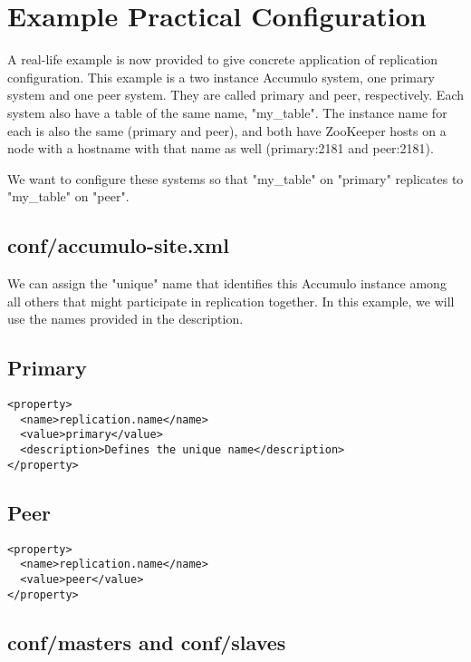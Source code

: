 \section{Example Practical Configuration}

A real-life example is now provided to give concrete application of replication configuration. This
example is a two instance Accumulo system, one primary system and one peer system. They are called
primary and peer, respectively. Each system also have a table of the same name, "my\_table". The instance
name for each is also the same (primary and peer), and both have ZooKeeper hosts on a node with a hostname
with that name as well (primary:2181 and peer:2181).

We want to configure these systems so that "my\_table" on "primary" replicates to "my\_table" on "peer".

\subsection{conf/accumulo-site.xml}

We can assign the "unique" name that identifies this Accumulo instance among all others that might participate
in replication together. In this example, we will use the names provided in the description.

\subsection{Primary}

\begingroup\fontsize{8pt}{8pt}\selectfont\begin{verbatim}
<property>
  <name>replication.name</name>
  <value>primary</value>
  <description>Defines the unique name</description>
</property>
\end{verbatim}\endgroup

\subsection{Peer}

\begingroup\fontsize{8pt}{8pt}\selectfont\begin{verbatim}
<property>
  <name>replication.name</name>
  <value>peer</value>
</property>
\end{verbatim}\endgroup

\subsection{conf/masters and conf/slaves}

